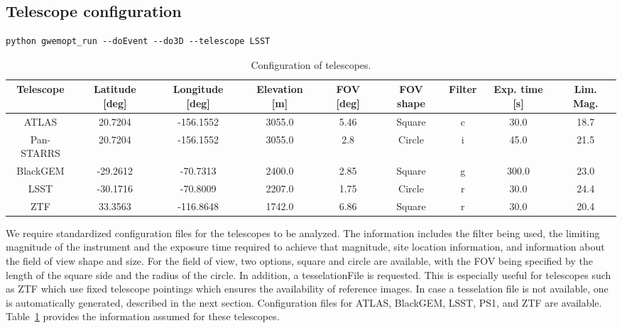 \documentclass[twocolumn]{aastex61}
\begin{document}
\subsection{Telescope configuration}
\begin{lstlisting}
python gwemopt_run --doEvent --do3D --telescope LSST
\end{lstlisting}
\begin{table}[H]
\scriptsize
\centering
\begin{tabular}{|c|c|c|c|c|c|c|c|c|}
\hline
Telescope & Latitude {[}deg{]} & Longitude {[}deg{]} & Elevation {[}m{]} & FOV {[}deg{]} & FOV shape & Filter & Exp. time {[}s{]} & Lim. Mag. \\ \hline
ATLAS          & 20.7204            & -156.1552           & 3055.0            & 5.46                                      & Square              & c      & 30.0                  & 18.7               \\ \hline
Pan-STARRS     & 20.7204            & -156.1552           & 3055.0            & 2.8                                       & Circle              & i      & 45.0                  & 21.5               \\ \hline
BlackGEM       & -29.2612           & -70.7313            & 2400.0            & 2.85                                      & Square              & g      & 300.0                 & 23.0               \\ \hline
LSST           & -30.1716           & -70.8009            & 2207.0            & 1.75                                      & Circle              & r      & 30.0                  & 24.4               \\ \hline
ZTF            & 33.3563            & -116.8648           & 1742.0            & 6.86                                      & Square              & r      & 30.0                  & 20.4               \\ \hline
\end{tabular}
\caption{Configuration of telescopes.}
\label{table:config}
\end{table}
We require standardized configuration files for the telescopes to be analyzed. 
The information includes the filter being used, the limiting magnitude of the instrument and the exposure time required to achieve that magnitude, site location information, and information about the field of view shape and size. For the field of view, two options, square and circle are available, with the FOV being specified by the length of the square side and the radius of the circle. In addition, a tesselationFile is requested. This is especially useful for telescopes such as ZTF which use fixed telescope pointings which ensures the availability of reference images. In case a tesselation file is not available, one is automatically generated, described in the next section.
Configuration files for ATLAS, BlackGEM, LSST, PS1, and ZTF are available.
Table~\ref{table:config} provides the information assumed for these telescopes.\\
\end{document}
